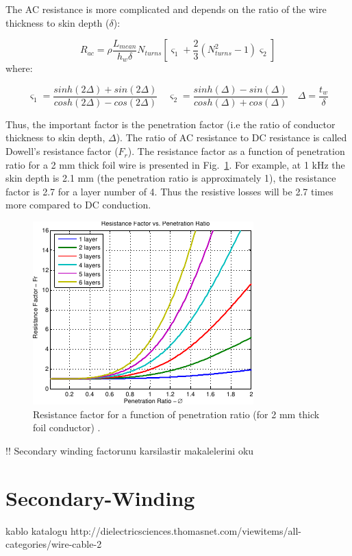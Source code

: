 \documentclass[a4paper, 11pt]{article} %
\begin{document}
The AC resistance is more complicated and depends on the ratio of the wire thickness to skin depth ($\delta$):

\begin{equation}
  R_{ac}=\rho \frac{L_{mean}}{h_w \delta} N_{turns} \left[\varsigma_1 + \frac{2}{3} (N_{turns}^2-1)\varsigma_2\right]
\end{equation}
where:

\begin{equation}
  \varsigma_1 = \dfrac{sinh(2\Delta)+sin(2\Delta)}{cosh(2\Delta)-cos(2\Delta)} \quad
  \varsigma_2 = \dfrac{sinh(\Delta)-sin(\Delta)}{cosh(\Delta)+cos(\Delta)} \quad  
  \Delta = \dfrac{t_w}{\delta}
\end{equation}

Thus, the important factor is the penetration factor (i.e the ratio of conductor thickness to skin depth, $\Delta$). The ratio of AC resistance to DC resistance is called Dowell's resistance factor ($F_r$). The resistance factor as a function of penetration ratio for a 2 mm thick foil wire is presented in Fig.~\ref{resistance_factor}. For example, at 1 kHz the skin depth is 2.1 mm (the penetration ratio is approximately 1), the resistance factor is 2.7 for a layer number of 4. Thus the resistive losses will be 2.7 times more compared to DC conduction.

\begin{figure}[]
  \centering
    \includegraphics[scale=1.25]{resistance_factor}
  \caption{Resistance factor for a function of penetration ratio (for 2 mm thick foil conductor) \cite{Villar2010}.}
  \label{resistance_factor}
\end{figure}

!! Secondary winding factorunu karsilastir
\cite{Sullivan2003,Ferreira1994} makalelerini oku

\section{Secondary-Winding}
kablo katalogu
http://dielectricsciences.thomasnet.com/viewitems/all-categories/wire-cable-2
\end{document}
